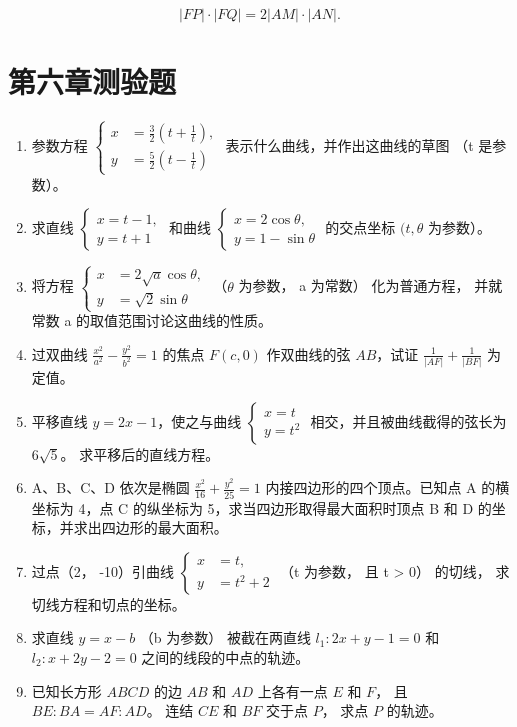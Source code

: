 \[
| FP | \cdot | FQ | = 2 | AM | \cdot | AN |.
\]

\section{第六章测验题}\label{ux7b2cux516dux7ae0ux6d4bux9a8cux9898}

\begin{enumerate}
\def\labelenumi{\arabic{enumi}.}
\item
  参数方程
  \(\left\{\begin{aligned}x&=\frac{3}{2}\left(t+\frac{1}{t}\right),\\ y&=\frac{5}{2}\left(t-\frac{1}{t}\right)\end{aligned}\right.\)
  表示什么曲线，并作出这曲线的草图 （t 是参数）。
\item
  求直线 \(\left\{\begin{aligned}x=t-1,\\ y=t+1\end{aligned}\right.\)
  和曲线
  \(\left\{\begin{aligned}x=2\cos\theta,\\ y=1-\sin\theta\end{aligned}\right.\)
  的交点坐标 \((t,\theta\) 为参数）。
\item
  将方程
  \(\left\{\begin{aligned}x&=2\sqrt{a}\cos\theta,\\ y&=\sqrt{2}\sin\theta\end{aligned}\right.\)
  （\(\theta\) 为参数， a 为常数） 化为普通方程， 并就常数 a
  的取值范围讨论这曲线的性质。
\item
  过双曲线 \(\frac{x^2}{a^2} - \frac{y^2}{b^2} = 1\) 的焦点 \(F(c, 0)\)
  作双曲线的弦 \(AB\)，试证 \(\frac{1}{|AF|} + \frac{1}{|BF|}\) 为定值。
\item
  平移直线 \(y = 2x - 1\)，使之与曲线
  \(\left\{ \begin{array}{l} x = t \\ y = t^2 \end{array} \right.\)
  相交，并且被曲线截得的弦长为 \(6\sqrt{5}\)。 求平移后的直线方程。
\item
  A、B、C、D 依次是椭圆 \(\frac{x^{2}}{16} + \frac{y^{2}}{25} = 1\)
  内接四边形的四个顶点。已知点 A 的横坐标为 4，点 C 的纵坐标为
  5，求当四边形取得最大面积时顶点 B 和 D
  的坐标，并求出四边形的最大面积。
\item
  过点（2， -10）引曲线
  \(\left\{\begin{aligned}x &= t, \\ y &= t^{2} + 2\end{aligned}\right.\)
  （t 为参数， 且 t \textgreater{} 0） 的切线， 求切线方程和切点的坐标。
\item
  求直线 \(y = x - b\) （b 为参数） 被截在两直线 \(l_1: 2x + y - 1 = 0\)
  和 \(l_2: x + 2y - 2 = 0\) 之间的线段的中点的轨迹。
\item
  已知长方形 \(ABCD\) 的边 \(AB\) 和 \(AD\) 上各有一点 \(E\) 和 \(F\)，
  且 \(BE: BA = AF: AD\)。 连结 \(CE\) 和 \(BF\) 交于点 \(P\)， 求点
  \(P\) 的轨迹。
\end{enumerate}

